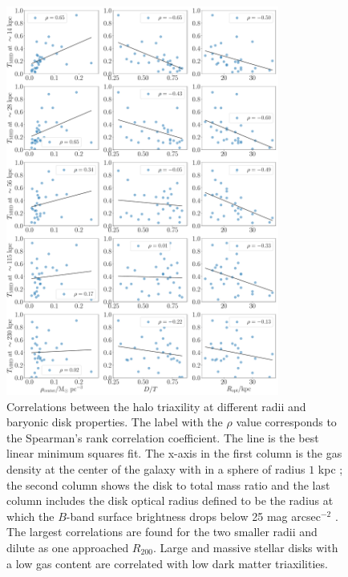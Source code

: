 \documentclass[a4paper,fleqn,usenatbib]{mnras}
\begin{document}
\begin{figure}
\begin{center}
\includegraphics[width=0.8\textwidth]{correlation_T_MHD_disk.pdf}
\end{center}
\caption{Correlations between the halo triaxility at different radii
  and baryonic disk properties. 
  The label with the $\rho$ value corresponds to the Spearman's rank
  correlation coefficient.
  The line is the best linear minimum squares fit.
  The x-axis in the first column is the gas density at the center of
  the galaxy with in a sphere of radius  $1$ kpc \citep{Pakmor17};
  the second column shows the disk to total mass ratio and the last
  column includes the disk optical radius defined to be the radius at which the
  $B$-band surface brightness drops below 25 mag arcsec$^{-2}$ \citep{auriga}.
  The largest correlations are found for the two smaller radii and
  dilute as one approached $R_{200}$.
  Large and massive stellar disks with a low gas content are
  correlated with low dark matter triaxilities.}
\label{fig:disk_correlations}
\end{figure}
\end{document}
